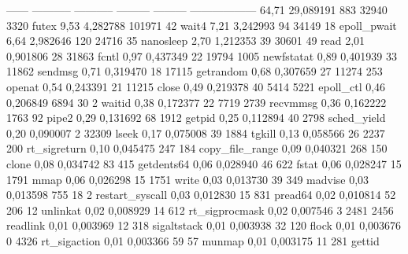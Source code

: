 \begin{myverbatim}
------ ----------- ----------- --------- --------- ------------------
 64,71   29,089191         883     32940      3320 futex
  9,53    4,282788      101971        42           wait4
  7,21    3,242993          94     34149        18 epoll_pwait
  6,64    2,982646         120     24716        35 nanosleep
  2,70    1,212353          39     30601        49 read
  2,01    0,901806          28     31863           fcntl
  0,97    0,437349          22     19794      1005 newfstatat
  0,89    0,401939          33     11862           sendmsg
  0,71    0,319470          18     17115           getrandom
  0,68    0,307659          27     11274       253 openat
  0,54    0,243391          21     11215           close
  0,49    0,219378          40      5414      5221 epoll_ctl
  0,46    0,206849        6894        30         2 waitid
  0,38    0,172377          22      7719      2739 recvmmsg
  0,36    0,162222        1763        92           pipe2
  0,29    0,131692          68      1912           getpid
  0,25    0,112894          40      2798           sched_yield
  0,20    0,090007           2     32309           lseek
  0,17    0,075008          39      1884           tgkill
  0,13    0,058566          26      2237       200 rt_sigreturn
  0,10    0,045475         247       184           copy_file_range
  0,09    0,040321         268       150           clone
  0,08    0,034742          83       415           getdents64
  0,06    0,028940          46       622           fstat
  0,06    0,028247          15      1791           mmap
  0,06    0,026298          15      1751           write
  0,03    0,013730          39       349           madvise
  0,03    0,013598         755        18         2 restart_syscall
  0,03    0,012830          15       831           pread64
  0,02    0,010814          52       206        12 unlinkat
  0,02    0,008929          14       612           rt_sigprocmask
  0,02    0,007546           3      2481      2456 readlink
  0,01    0,003969          12       318           sigaltstack
  0,01    0,003938          32       120           flock
  0,01    0,003676           0      4326           rt_sigaction
  0,01    0,003366          59        57           munmap
  0,01    0,003175          11       281           gettid
\end{myverbatim}
\newpage
